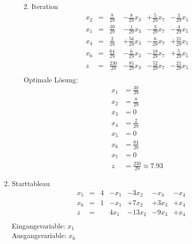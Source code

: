 \documentclass[a4paper]{scrartcl}
\begin{document}
\begin{enumerate}
\begin{enumerate}
                2. Iteration
                \begin{equation}
                    \begin{array}{rcrrrr}
                        x_2 & = & \frac{8}{29} & -\frac{8}{29}x_3 & +\frac{5}{29}x_7 & -\frac{3}{29}x_5 \\
                        x_1 & = & \frac{30}{29} & -\frac{1}{29}x_3 & -\frac{3}{29}x_7 & -\frac{4}{29}x_5 \\
                        x_4 & = & \frac{2}{29} & +\frac{56}{29}x_3 & -\frac{6}{29}x_7 & +\frac{21}{29}x_5 \\
                        x_6 & = & \frac{64}{29} & -\frac{6}{29}x_3 & -\frac{18}{29}x_7 & +\frac{5}{29}x_5 \\
                        \hline
                        z   & = & \frac{230}{29} & -\frac{85}{29}x_3 & -\frac{52}{29}x_7 & -\frac{21}{29}x_5 \\
                    \end{array}
                \end{equation}
                Optimale Lösung:
                \begin{equation}
                    \begin{split}
                        x_1 &= \frac{30}{29} \\
                        x_2 &= \frac{8}{29} \\
                        x_3 &= 0 \\
                        x_4 &= \frac{2}{29} \\
                        x_5 &= 0 \\
                        x_6 &= \frac{64}{29} \\
                        x_7 &= 0 \\
                        z   &= \frac{230}{29} \approx \num{7,93}
                    \end{split}
                \end{equation}
                
        \end{enumerate}

    \item %
        Starttableau
        \begin{equation}
            \begin{array}{rcrrrrr}
                x_5 & = & 4 & -x_1 & -3x_2 & -x_3 & -x_4 \\
                x_6 & = & 1 & -x_1 & +7x_2 & +3x_3 & +x_4 \\
                \hline
                z   & = &   & 4x_1 & -13x_2 & -9x_3 & +x_4 \\
            \end{array}
        \end{equation}
        Eingangsvariable: $x_1$ \\
        Ausgangsvariable: $x_6$ \\


\end{enumerate}
\end{document}
